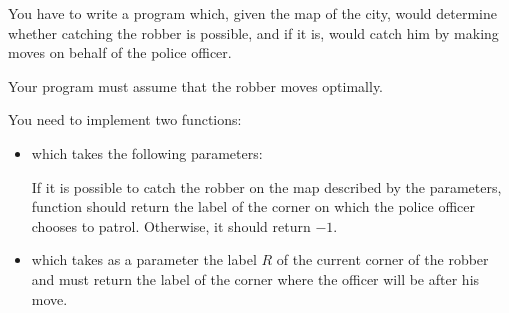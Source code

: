 \documentclass{boi2014}
\begin{document}
    \Task
    You have to write a program which, given the map of the city,
    would determine whether catching the robber is possible, and if it is,
    would catch him by making moves on behalf of the police officer.

    Your program must assume that the robber moves optimally.

    \Implementation
    You need to implement two functions:
    \begin{itemize}
        \item {} which takes the following parameters:

        If it is possible to catch the robber on the map described
        by the parameters, function  should return the
        label of the corner on which the police officer chooses to patrol.
        Otherwise, it should return $-1$.

        \item {} which takes as a
            parameter the label $R$ of the current corner of the robber
            and must return the label of the corner where the officer
            will be after his move.
    \end{itemize}
\end{document}

